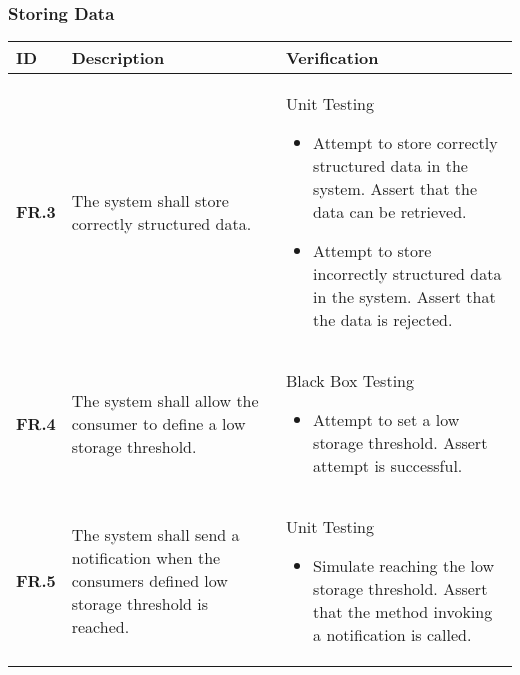 \subsubsection{Storing Data}
\begin{table}
    \begin{tabular}{|l|l|l|}
        \hline
        \textbf{ID}    & \textbf{Description}                                                                                                                           & \textbf{Verification}                                                                                                                                                                                                                                                                    \\ \hline
        \textbf{FR.3}  & The system shall store correctly structured data.                                                                                              & Unit Testing\begin{itemize}\item Attempt to store correctly structured data in the system. Assert that the data can be retrieved.\item Attempt to store incorrectly structured data in the system. Assert that the data is rejected.\end{itemize}                                \\ \hline
        \textbf{FR.4}  & The system shall allow the consumer to define a low storage threshold.                                                                         & Black Box Testing\begin{itemize}\item Attempt to set a low storage threshold. Assert attempt is successful.\end{itemize}                                                                                                                                                           \\ \hline
        \textbf{FR.5}  & The system shall send a notification when the consumers defined low storage threshold is reached.                                              & Unit Testing\begin{itemize}\item Simulate reaching the low storage threshold. Assert that the method invoking a notification is called.\end{itemize}                                                                                                                               \\ \hline

\end{tabular}
\end{table}
